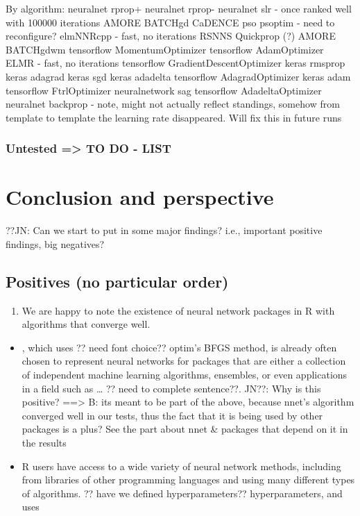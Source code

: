 By algorithm: neuralnet rprop+ neuralnet rprop- neuralnet slr - once
ranked well with 100000 iterations AMORE BATCHgd CaDENCE pso psoptim -
need to reconfigure? elmNNRcpp - fast, no iterations RSNNS Quickprop (?)
AMORE BATCHgdwm tensorflow MomentumOptimizer tensorflow AdamOptimizer
ELMR - fast, no iterations tensorflow GradientDescentOptimizer keras
rmsprop keras adagrad keras sgd keras adadelta tensorflow
AdagradOptimizer keras adam tensorflow FtrlOptimizer neuralnetwork sag
tensorflow AdadeltaOptimizer neuralnet backprop - note, might not
actually reflect standings, somehow from template to template the
learning rate disappeared. Will fix this in future runs

\hypertarget{untested-to-do---list}{%
\subsubsection{Untested =\textgreater{} TO DO -
LIST}\label{untested-to-do---list}}

\hypertarget{conclusion-and-perspective}{%
\section{Conclusion and perspective}\label{conclusion-and-perspective}}

??JN: Can we start to put in some major findings? i.e., important
positive findings, big negatives?

\hypertarget{positives-no-particular-order}{%
\subsection{Positives (no particular
order)}\label{positives-no-particular-order}}

\begin{enumerate}
\def\labelenumi{\arabic{enumi}.}
\tightlist
\item
  We are happy to note the existence of neural network packages in R
  with algorithms that converge well.
\end{enumerate}

\begin{itemize}
\tightlist
\item
  , which uses ?? need font choice?? optim's BFGS method, is
  already often chosen to represent neural networks for packages that
  are either a collection of independent machine learning algorithms,
  ensembles, or even applications in a field such as \ldots{} ?? need to
  complete sentence??. JN??: Why is this positive? ==\textgreater{} B:
  its meant to be part of the above, because nnet's algorithm converged
  well in our tests, thus the fact that it is being used by other
  packages is a plus? See the part about nnet \& packages that depend on
  it in the results
\item
  R users have access to a wide variety of neural network methods,
  including from libraries of other programming languages and using many
  different types of algorithms. ?? have we defined hyperparameters??
  hyperparameters, and uses 
\end{itemize}

